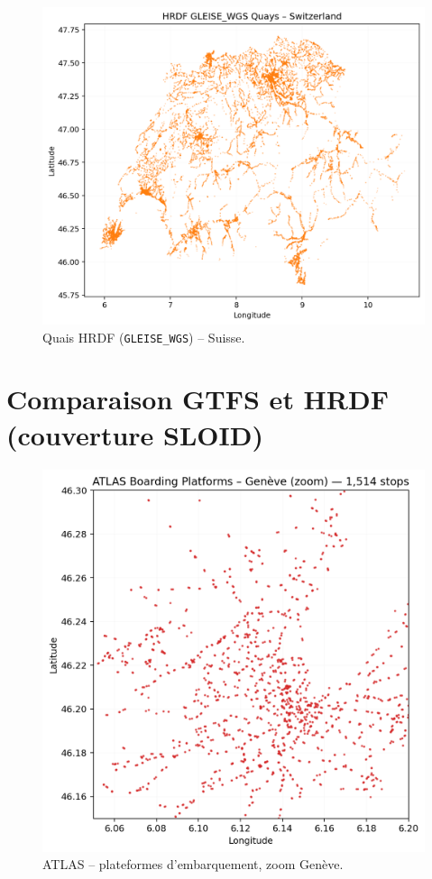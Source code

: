 \begin{figure}[H]
  \centering
  \includegraphics[width=.76\linewidth]{figures/plots/hrdf_quays_switzerland.png}
  \caption[Quais HRDF – Suisse]{Quais HRDF (\texttt{GLEISE\_WGS}) – Suisse.}
\end{figure}


\section{Comparaison GTFS et HRDF (couverture SLOID)}

\begin{figure}[H]
  \centering
  \includegraphics[width=.7\linewidth]{figures/plots/atlas_points_geneva.png}
  \caption[ATLAS – Genève]{ATLAS – plateformes d'embarquement, zoom Genève.}
  \label{fig:atlas_geneva}
\end{figure}

